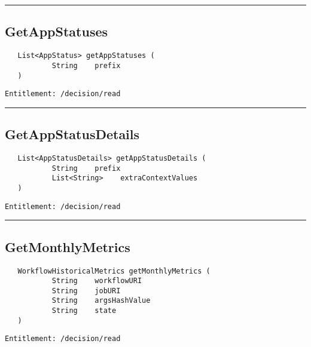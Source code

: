 \rule{12cm}{2pt}
\subsection{GetAppStatuses}
\label{Api:GetAppStatuses}
\begin{Verbatim}
   List<AppStatus> getAppStatuses (
           String    prefix
   )
\end{Verbatim}
\begin{Verbatim}[formatcom=\color{Maroon}]
  Entitlement: /decision/read
\end{Verbatim}



\rule{12cm}{2pt}
\subsection{GetAppStatusDetails}
\label{Api:GetAppStatusDetails}
\begin{Verbatim}
   List<AppStatusDetails> getAppStatusDetails (
           String    prefix
           List<String>    extraContextValues
   )
\end{Verbatim}
\begin{Verbatim}[formatcom=\color{Maroon}]
  Entitlement: /decision/read
\end{Verbatim}



\rule{12cm}{2pt}
\subsection{GetMonthlyMetrics}
\label{Api:GetMonthlyMetrics}
\begin{Verbatim}
   WorkflowHistoricalMetrics getMonthlyMetrics (
           String    workflowURI
           String    jobURI
           String    argsHashValue
           String    state
   )
\end{Verbatim}
\begin{Verbatim}[formatcom=\color{Maroon}]
  Entitlement: /decision/read
\end{Verbatim}



